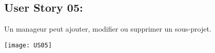 \newpage{}
\subsection{User Story 05:}
Un manageur peut ajouter, modifier ou supprimer un sous-projet.


  \begin{center}
        \texttt{[image: US05]}
  \end{center}